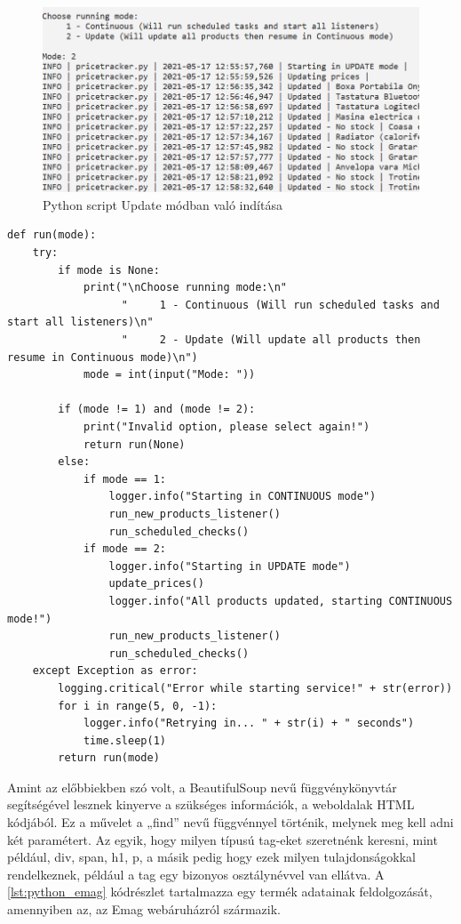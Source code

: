 \begin{figure}[H]
    \centering
    \includegraphics[scale=0.9]{figures/images/python_start.png}
    \caption{Python script Update módban való indítása}
    \label{fig:python_start}
\end{figure}

\begin{lstlisting}[caption={Backend szolgáltatás indítása}, label={lst:python_start}, basicstyle=\footnotesize]
    def run(mode):
    try:
        if mode is None:
            print("\nChoose running mode:\n"
                  "     1 - Continuous (Will run scheduled tasks and start all listeners)\n"
                  "     2 - Update (Will update all products then resume in Continuous mode)\n")
            mode = int(input("Mode: "))

        if (mode != 1) and (mode != 2):
            print("Invalid option, please select again!")
            return run(None)
        else:
            if mode == 1:
                logger.info("Starting in CONTINUOUS mode")
                run_new_products_listener()
                run_scheduled_checks()
            if mode == 2:
                logger.info("Starting in UPDATE mode")
                update_prices()
                logger.info("All products updated, starting CONTINUOUS mode!")
                run_new_products_listener()
                run_scheduled_checks()
    except Exception as error:
        logging.critical("Error while starting service!" + str(error))
        for i in range(5, 0, -1):
            logger.info("Retrying in... " + str(i) + " seconds")
            time.sleep(1)
        return run(mode)
\end{lstlisting}

Amint az előbbiekben szó volt, a BeautifulSoup nevű függvénykönyvtár segítségével lesznek kinyerve a szükséges információk, a weboldalak HTML kódjából. Ez a művelet a „find” nevű függvénnyel történik, melynek meg kell adni két paramétert. Az egyik, hogy milyen típusú tag-eket szeretnénk keresni, mint például, div, span, h1, p, a másik pedig hogy ezek milyen tulajdonságokkal rendelkeznek, például a tag egy bizonyos osztálynévvel van ellátva. A \ref{lst:python_emag} kódrészlet tartalmazza egy termék adatainak feldolgozását, amennyiben az, az Emag webáruházról származik. 

